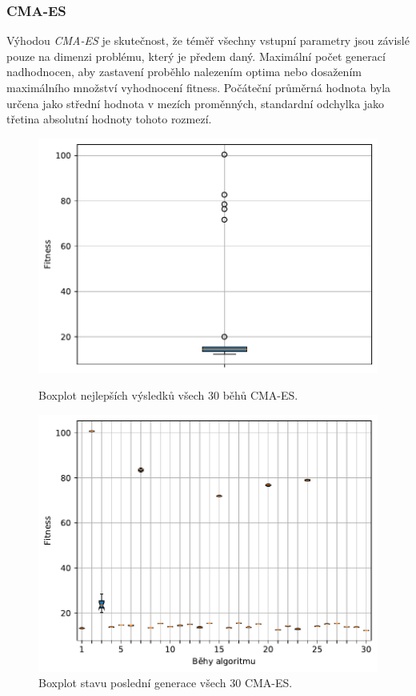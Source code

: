 \subsubsection{CMA-ES}
Výhodou \emph{CMA-ES} je skutečnost, že téměř všechny vstupní parametry jsou závislé pouze na dimenzi problému, který je předem daný. Maximální počet generací nadhodnocen, aby zastavení proběhlo nalezením optima nebo dosažením maximálního množství vyhodnocení fitness. Počáteční průměrná hodnota byla určena jako střední hodnota v mezích proměnných, standardní odchylka jako třetina absolutní hodnoty tohoto rozmezí.

\begin{figure}[H]
\begin{minipage}[t]{0.475\linewidth}
\includegraphics[width=\linewidth]{obrazky-figures/statistics/Benchmarks/Rosenbrock/CMAES/bestsBoxplot_WithOutliers.pdf}
\caption{Boxplot nejlepších výsledků všech $30$ běhů CMA-ES.}
\label{fg:bench:rosenbrock:cmaes:best}
\end{minipage}
\hfill
\begin{minipage}[t]{0.475\linewidth}
\includegraphics[width=\linewidth]{obrazky-figures/statistics/Benchmarks/Rosenbrock/CMAES/lastGenBoxplots.pdf}
\caption{Boxplot stavu poslední generace všech $30$ CMA-ES.}
\label{fg:bench:rosenbrock:cmaes:lastGen}
\end{minipage}
\end{figure}

